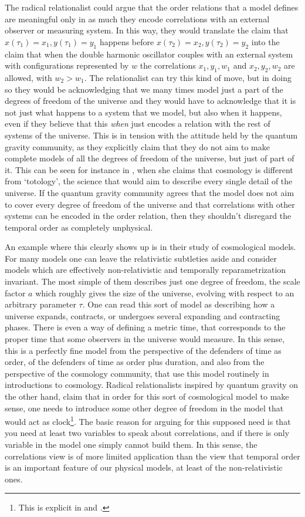 \documentclass[12 pt]{article}
\begin{document}
The radical relationalist could argue that the order relations that a model defines are meaningful only in as much they encode correlations with an external observer or measuring system. In this way, they would translate the claim that $x(\tau_1)=x_1,y(\tau_1)=y_1$ happens before $x(\tau_2)=x_2,y(\tau_2)=y_2$ into the claim that when the double harmonic oscillator couples with an external system with configurations represented by $w$ the correlations $x_1,y_1,w_1$ and $x_2,y_2,w_2$ are allowed, with $w_2>w_1$. The relationalist can try this kind of move, but in doing so they would be acknowledging that we many times model just a part of the degrees of freedom of the universe and they would have to acknowledge that it is not just what happens to a system that we model, but also when it happens, even if they believe that this \textit{when} just encodes a relation with the rest of systems of the universe. This is in tension with the attitude held by the quantum gravity community, as they explicitly claim that they do not aim to make complete models of all the degrees of freedom of the universe, but just of part of it. This can be seen for instance in \citep{Vidotto2017}, when she claims that cosmology is different from `totology', the science that would aim to describe every single detail of the universe. If the quantum gravity community agrees that the model does not aim to cover every degree of freedom of the universe and that correlations with other systems can be encoded in the order relation, then they shouldn't disregard the temporal order as completely unphysical.

An example where this clearly shows up is in their study of cosmological models. For many models one can leave the relativistic subtleties aside and consider models which are effectively non-relativistic and temporally reparametrization invariant. The most simple of them describes just one degree of freedom, the scale factor $a$ which roughly gives the size of the universe, evolving with respect to an arbitrary parameter $\tau$. One can read this sort of model as describing how a universe expands, contracts, or undergoes several expanding and contracting phases. There is even a way of defining a metric time, that corresponds to the proper time that some observers in the universe would measure. In this sense, this is a perfectly fine model from the perspective of the defenders of time as order, of the defenders of time as order plus duration, and also from the perspective of the cosmology community, that use this model routinely in introductions to cosmology. Radical relationalists inspired by quantum gravity on the other hand, claim that in order for this sort of cosmological model to make sense, one needs to introduce some other degree of freedom in the model that would act as clock\footnote{This is explicit in \cite[Sect. 15.3.2]{Vidotto2017} and \cite{Marchetti2021}.}. The basic reason for arguing for this supposed need is that you need at least two variables to speak about correlations, and if there is only variable in the model one simply cannot build them. In this sense, the correlations view is of more limited application than the view that temporal order is an important feature of our physical models, at least of the non-relativistic ones.
\end{document}
